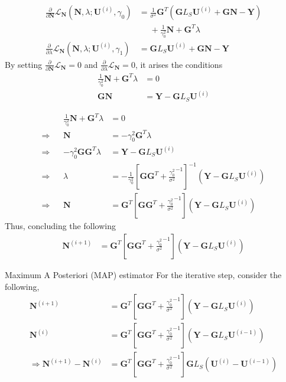 \documentclass[progressbar=head]{beamer}
\newcommand{\ppar}[1]{ \left( #1 \right) }
\newcommand{\spar}[1]{ \left[ #1 \right] }
\newcommand{\Y}{\mathbf{Y}}
\newcommand{\G}{\mathbf{G}}
\newcommand{\U}{\mathbf{U}}
\newcommand{\N}{\mathbf{N}}
\begin{document}
\begin{frame}
\begin{align*}
\frac{\partial}{\partial \N}
\mathscr{L}_\N \ppar{\N, \lambda; \U^{(i)}, \gamma_0}
    &=
    \frac{1}{\sigma^2}
    \G^T
    \ppar{\G L_S \U^{(i)} + \G \N - \Y}
    \\
    &\phantom{=}
    +
    \frac{1}{\gamma_0^2} {\N}
    +
    \G^T \lambda
    \\
    \frac{\partial}{\partial \lambda} 
    \mathscr{L}_\N \ppar{\N, \lambda; \U^{(i)}, \gamma_1}
    &=
    \G L_S \U^{(i)} + \G \N - \Y
\end{align*}
By setting $\frac{\partial}{\partial \N} \mathscr{L}_\N = 0$ and 
$\frac{\partial}{\partial \lambda} \mathscr{L}_\N = 0$, it arises the conditions
\begin{align*}
    {\frac{1}{\gamma_0^2} { \N}
    +
    \G^T \lambda} &= 0
    \\
    \G \N 
    &= \Y - \G L_S \U^{(i)} 
\end{align*}
\end{frame}

\begin{frame}
\begin{align*}
&&
{\frac{1}{\gamma_0^2} { \N}
    +
    \G^T \lambda} &= 0
\\
\Rightarrow
&&
\N &= -\gamma_0^2 \G^T \lambda
\\
\Rightarrow
&&
-\gamma_0^2 \G \G^T \lambda
&=
\Y - \G L_S \U^{(i)} 
\\
\Rightarrow
&&
\lambda &=
-\frac{1}{\gamma_0^2} \spar{\G \G^T+ \frac{\gamma_0^2}{\sigma^2}^{-1}}^{-1} \ppar{\Y - \G L_S \U^{(i)} }
\\
\Rightarrow
&&
\N &=
\G^T \spar{\G \G^T+ \frac{\gamma_0^2}{\sigma^2}^{-1}} \ppar{\Y - \G L_S \U^{(i)} }
\end{align*}
Thus, concluding the following
\begin{align*}
\N^{(i+1)} &=
\G^T \spar{\G \G^T+ \frac{\gamma_0^2}{\sigma^2}^{-1}} \ppar{\Y - \G L_S \U^{(i)} }
\end{align*}
\end{frame}

\begin{frame}{Maximum A Posteriori (MAP) estimator}
For the iterative step, consider the following,
\begin{align*}
\N^{(i+1)} &=
\G^T \spar{\G \G^T+ \frac{\gamma_0^2}{\sigma^2}^{-1}} \ppar{\Y - \G L_S \U^{(i)} }
\\
\N^{(i)} &=
\G^T \spar{\G \G^T+ \frac{\gamma_0^2}{\sigma^2}^{-1}} \ppar{\Y - \G L_S \U^{(i-1)} }
\\
\Rightarrow
\N^{(i+1)}-\N^{(i)} &=
\G^T \spar{\G \G^T+ \frac{\gamma_0^2}{\sigma^2}^{-1}} \G L_S \ppar{ \U^{(i)}-\U^{(i-1)} }
\end{align*}
\end{frame}
\end{document}
